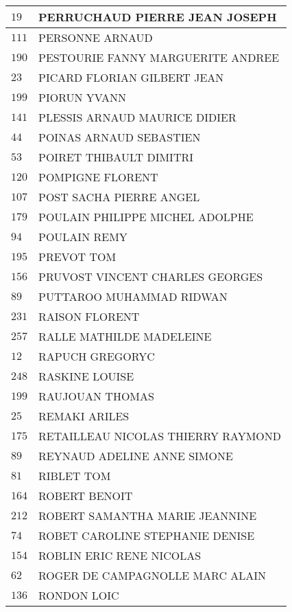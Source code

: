 \begin{xltabular}{\linewidth}{|l|X|}
    \hline
    $19$ & PERRUCHAUD PIERRE JEAN JOSEPH \\
    \hline
    $111$ & PERSONNE ARNAUD \\
    \hline
    $190$ & PESTOURIE FANNY MARGUERITE ANDREE \\
    \hline
    $23$ & PICARD FLORIAN GILBERT JEAN \\
    \hline
    $199$ & PIORUN YVANN \\
    \hline
    $141$ & PLESSIS ARNAUD MAURICE DIDIER \\
    \hline
    $44$ & POINAS ARNAUD SEBASTIEN \\
    \hline
    $53$ & POIRET THIBAULT DIMITRI \\
    \hline
    $120$ & POMPIGNE FLORENT \\
    \hline
    $107$ & POST SACHA PIERRE ANGEL \\
    \hline
    $179$ & POULAIN PHILIPPE MICHEL ADOLPHE \\
    \hline
    $94$ & POULAIN REMY \\
    \hline
    $195$ & PREVOT TOM \\
    \hline
    $156$ & PRUVOST VINCENT CHARLES GEORGES \\
    \hline
    $89$ & PUTTAROO MUHAMMAD RIDWAN \\
    \hline
    $231$ & RAISON FLORENT \\
    \hline
    $257$ & RALLE MATHILDE MADELEINE \\
    \hline
    $12$ & RAPUCH GREGORYC \\
    \hline
    $248$ & RASKINE LOUISE \\
    \hline
    $199$ & RAUJOUAN THOMAS \\
    \hline
    $25$ & REMAKI ARILES \\
    \hline
    $175$ & RETAILLEAU NICOLAS THIERRY RAYMOND \\
    \hline
    $89$ & REYNAUD ADELINE ANNE SIMONE \\
    \hline
    $81$ & RIBLET TOM \\
    \hline
    $164$ & ROBERT BENOIT \\
    \hline
    $212$ & ROBERT SAMANTHA MARIE JEANNINE \\
    \hline
    $74$ & ROBET CAROLINE STEPHANIE DENISE \\
    \hline
    $154$ & ROBLIN ERIC RENE NICOLAS \\
    \hline
    $62$ & ROGER DE CAMPAGNOLLE MARC ALAIN \\
    \hline
    $136$ & RONDON LOIC \\

\end{xltabular}
